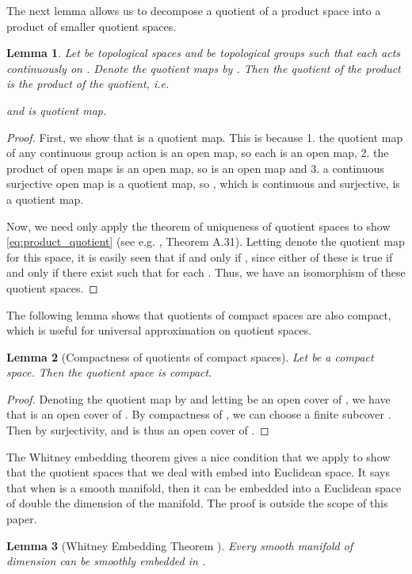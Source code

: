 \documentclass{article} \usepackage{iclr2023_conference,times}
\newtheorem{lemma}{Lemma}
\begin{document}
The next lemma allows us to decompose a quotient of a product space into a product of smaller quotient spaces.

\begin{lemma}\label{lem:product_quotient}
    Let  be topological spaces and  be topological groups such that each  acts continuously on . Denote the quotient maps by . Then the quotient of the product is the product of the quotient, i.e.
    
    and   is quotient map.
\end{lemma}
\begin{proof}
    First, we show that  is a quotient map. This is because 1. the quotient map of any continuous group action is an open map, so each  is an open map, 2. the product of open maps is an open map, so  is an open map and 3. a continuous surjective open map is a quotient map, so , which is continuous and surjective, is a quotient map.

    Now, we need only apply the theorem of uniqueness of quotient spaces to show \eqref{eq:product_quotient} (see e.g. \cite{lee2013smooth}, Theorem A.31). Letting  denote the quotient map for this space, it is easily seen that  if and only if , since either of these is true if and only if there exist  such that  for each . Thus, we have an isomorphism of these quotient spaces.
\end{proof}

The following lemma shows that quotients of compact spaces are also compact, which is useful for universal approximation on quotient spaces.

\begin{lemma}[Compactness of quotients of compact spaces]\label{lem:quotient_compact}
    Let  be a compact space. Then the quotient space  is compact.
\end{lemma}
\begin{proof}
    Denoting the quotient map by  and letting  be an open cover of , we have that  is an open cover of . By compactness of , we can choose a finite subcover . Then  by surjectivity, and  is thus an open cover of .
\end{proof}

The Whitney embedding theorem gives a nice condition that we apply to show that the quotient spaces  that we deal with embed into Euclidean space. It says that when  is a smooth manifold, then it can be embedded into a Euclidean space of double the dimension of the manifold. The proof is outside the scope of this paper.
\begin{lemma}[Whitney Embedding Theorem \citep{whitney1944self}]\label{lem:whitney}
    Every smooth manifold  of dimension  can be smoothly embedded in .
\end{lemma}
\end{document}

